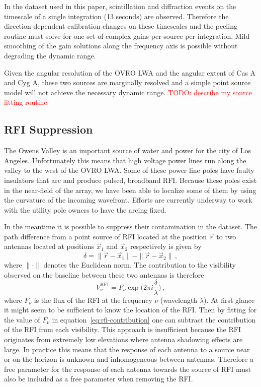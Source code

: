 \documentclass[twocolumn]{aastex6}
\newcommand{\todo}[1]{\textcolor{red}{TODO: #1}\PackageWarning{TODO:}{#1!}}
\begin{document}
In the dataset used in this paper, scintillation and diffraction events on the timescale of a single
integration (13 seconds) are observed. Therefore the direction dependent calibration changes on
these timescales and the peeling routine must solve for one set of complex gains per source per
integration. Mild smoothing of the gain solutions along the frequency axis is possible without
degrading the dynamic range.

Given the angular resolution of the OVRO LWA and the angular extent of Cas A and Cyg A, these two
sources are marginally resolved and a simple point source model will not achieve the necessary
dynamic range. \todo{describe my source fitting routine}

\subsection{RFI Suppression}

The Owens Valley is an important source of water and power for the city of Los Angeles.
Unfortunately this means that high voltage power lines run along the valley to the west of the OVRO
LWA. Some of these power line poles have faulty insulators that arc and produce pulsed, broadband
RFI. Because these poles exist in the near-field of the array, we have been able to localize some of
them by using the curvature of the incoming wavefront. Efforts are currently underway to work with
the utility pole owners to have the arcing fixed.

In the meantime it is possible to suppress their contamination in the dataset.  The path difference
from a point source of RFI located at the position $\vec r$ to two antennas located at positions
$\vec x_1$ and $\vec x_2$ respectively is given by
\begin{equation}
    \delta = \|\vec r - \vec x_1\| - \|\vec r - \vec x_2\|\,,
\end{equation}
where $\|\cdot\|$ denotes the Euclidean norm. The contribution to the visibility observed on the
baseline between these two antennas is therefore
\begin{equation}\label{eq:rfi-contribution}
    V^\text{RFI}_\nu = F_\nu \exp\bigg(2\pi i\frac{\delta}{\lambda}\bigg)\,,
\end{equation}
where $F_\nu$ is the flux of the RFI at the frequency $\nu$ (wavelength $\lambda$).  At first glance
it might seem to be sufficient to know the location of the RFI. Then by fitting for the value of
$F_\nu$ in equation~\ref{eq:rfi-contribution} one can subtract the contribution of the RFI from each
visibility. This approach is insufficient because the RFI originates from extremely low elevations
where antenna shadowing effects are large. In practice this means that the response of each antenna
to a source near or on the horizon is unknown and inhomogeneous between antennas. Therefore a free
parameter for the response of each antenna towards the source of RFI must also be included as a free
parameter when removing the RFI.
\end{document}
